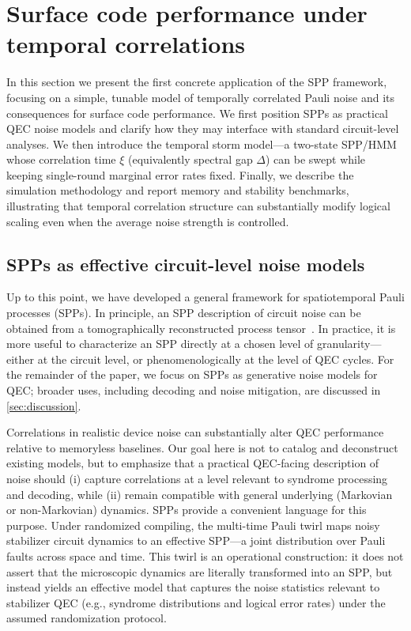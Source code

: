 \documentclass[
    aps,
    prx,
    reprint,
    superscriptaddress,
    longbibliography,
    nofootinbib,
    floatfix,
]{revtex4-2}
\begin{document}
\section{Surface code performance under temporal correlations}\label{sec:temporalstormmodel}
In this section we present the first concrete application of the SPP framework, focusing on a simple, tunable model of temporally correlated Pauli noise and its consequences for surface code performance. We first position SPPs as practical QEC noise models and clarify how they may interface with standard circuit-level analyses. We then introduce the temporal storm model---a two-state SPP/HMM whose correlation time \(\xi\) (equivalently spectral gap \(\Delta\)) can be swept while keeping single-round marginal error rates fixed. Finally, we describe the simulation methodology and report memory and stability benchmarks, illustrating that temporal correlation structure can substantially modify logical scaling even when the average noise strength is controlled.

\subsection{SPPs as effective circuit-level noise models}
Up to this point, we have developed a general framework for spatiotemporal Pauli processes (SPPs). In principle, an SPP description of circuit noise can be obtained from a tomographically reconstructed process tensor~\cite{whiteDemonstrationNonMarkovianProcess2020,whiteUnifyingNonMarkovianCharacterization2025}. In practice, it is more useful to characterize an SPP directly at a chosen level of granularity---either at the circuit level, or phenomenologically at the level of QEC cycles. For the remainder of the paper, we focus on SPPs as generative noise models for QEC; broader uses, including decoding and noise mitigation, are discussed in \cref{sec:discussion}.

Correlations in realistic device noise can substantially alter QEC performance relative to memoryless baselines. 
Our goal here is not to catalog and deconstruct existing models, but to emphasize that a practical QEC-facing description of noise should (i) capture correlations at a level relevant to syndrome processing and decoding, while (ii) remain compatible with general underlying (Markovian or non-Markovian) dynamics. SPPs provide a convenient language for this purpose. Under randomized compiling, the multi-time Pauli twirl maps noisy stabilizer circuit dynamics to an effective SPP---a joint distribution over Pauli faults across space and time. This twirl is an operational construction: it does not assert that the microscopic dynamics are literally transformed into an SPP, but instead yields an effective model that captures the noise statistics relevant to stabilizer QEC (e.g., syndrome distributions and logical error rates) under the assumed randomization protocol.
\end{document}
